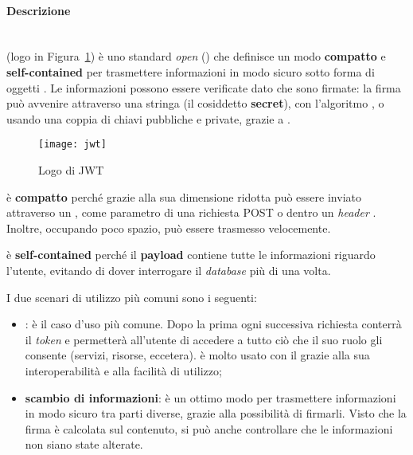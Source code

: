 \paragraph{Descrizione} \mbox{} \\
 (logo in Figura~\ref{fig:jwt}) è uno standard \textit{open} (\cite{rfc:7519}) che definisce un modo \textbf{compatto} e \textbf{self-contained} per trasmettere informazioni in modo sicuro sotto forma di oggetti . Le informazioni possono essere verificate dato che sono firmate: la firma può avvenire attraverso una stringa (il cosiddetto \textbf{secret}), con l'algoritmo , o usando una coppia di chiavi pubbliche e private, grazie a .

\begin{figure}[h]
  \begin{center}
    \texttt{[image: jwt]}
  \caption[Logo di JWT]{Logo di JWT\protect\footnotemark}
  \label{fig:jwt}
  \end{center} 
\end{figure}

 è \textbf{compatto} perché grazie alla sua dimensione ridotta può essere inviato attraverso un , come parametro di una richiesta POST o dentro un \textit{header} . Inoltre, occupando poco spazio, può essere trasmesso velocemente. 

 è \textbf{self-contained} perché il \textbf{payload} contiene tutte le informazioni riguardo l'utente, evitando di dover interrogare il \textit{database} più di una volta.

I due scenari di utilizzo più comuni sono i seguenti:
\begin{itemize}
\item \textbf{}: è il caso d'uso più comune. Dopo la prima  ogni successiva richiesta conterrà il \textit{token} e permetterà all'utente di accedere a tutto ciò che il suo ruolo gli consente (servizi, risorse, eccetera).  è molto usato con il  grazie alla sua interoperabilità e alla facilità di utilizzo;
\item \textbf{scambio di informazioni}:  è un ottimo modo per trasmettere informazioni in modo sicuro tra parti diverse, grazie alla possibilità di firmarli. Visto che la firma è calcolata sul contenuto, si può anche controllare che le informazioni non siano state alterate.
\end{itemize}

